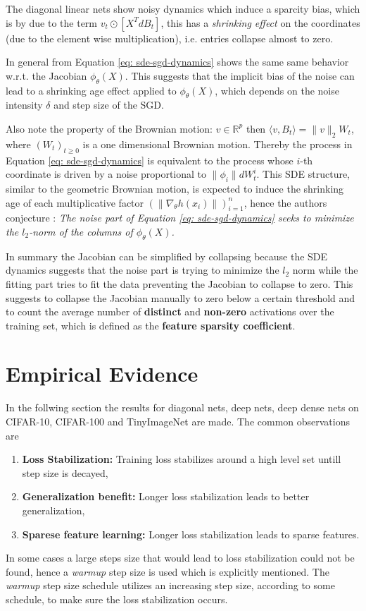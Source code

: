 The diagonal linear nets show noisy dynamics which induce a sparcity bias,
which is by \cite{andriushchenko2023sgd} due to the term $v_t \odot [X^{T}dB_t]$,
this has a \textit{shrinking effect} on the coordinates (due to the element wise
multiplication), i.e. entries collapse almost to zero.
\newline

In general from Equation \ref{eq: sde-sgd-dynamics} shows the same
same behavior w.r.t. the Jacobian $\phi_\theta(X)$. This
suggests that the implicit bias of the noise can lead to a shrinking age
effect applied to $\phi_\theta(X)$, which depends on the noise intensity
$\delta$ and step size of the SGD.

Also note the property of the Brownian
motion: $v \in \mathbb{R}^{p}$ then $\langle v, B_t\rangle = \|v\|_2 W_t$,
where $(W_t)_{t\ge 0}$ is a one dimensional Brownian motion. Thereby the
process in Equation \ref{eq: sde-sgd-dynamics} is equivalent to the process
whose $i$-th coordinate is driven by a noise proportional to
$\|\phi_i\|dW_{t}^{i}$. This SDE structure, similar to the geometric
Brownian motion, is expected to induce the shrinking age of each
multiplicative factor $(\|\nabla_\theta h(x_i)\|)_{i=1}^{n}$, hence the
authors conjecture \cite{andriushchenko2023sgd}: \textit{The noise part of Equation
\ref{eq: sde-sgd-dynamics} seeks to minimize the $l_2$-norm of the columns
of $\phi_\theta(X)$.}
\newline

In summary the Jacobian can be simplified by collapsing because the SDE
dynamics suggests that the noise part is trying to minimize the $l_2$ norm
while the fitting part tries to fit the data preventing the Jacobian to
collapse to zero. This suggests to collapse the Jacobian manually to zero
below a certain threshold and to count the average number of
\textbf{distinct} and \textbf{non-zero} activations over the training set,
which is defined as the \textbf{feature sparsity coefficient}.

\section{Empirical Evidence}
In the follwing section the results for diagonal nets, deep nets, deep dense
nets on CIFAR-10, CIFAR-100 and TinyImageNet are made. The common
observations are
\begin{enumerate}
    \item \textbf{Loss Stabilization:} Training loss stabilizes around a high
        level set untill step size is decayed,
    \item \textbf{Generalization benefit:} Longer loss stabilization leads
        to better generalization,
    \item \textbf{Sparese feature learning:} Longer loss stabilization
        leads to sparse features.
\end{enumerate}
In some cases a large steps size that would lead to loss stabilization could
not be found, hence a \textit{warmup} step size is used which is explicitly
mentioned. The \textit{warmup} step size schedule utilizes an increasing step
size, according to some schedule, to make sure the loss stabilization occurs.
\newline

